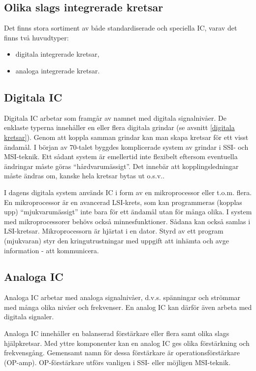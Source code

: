\subsection{Olika slags integrerade kretsar}

Det finns stora sortiment av både standardiserade och speciella IC, varav det
finns två huvudtyper:
\begin{itemize}
\item digitala integrerade kretsar,
\item analoga integrerade kretsar.
\end{itemize}

\subsection{Digitala IC}

Digitala IC arbetar som framgår av namnet med digitala signalnivåer. De enklaste
typerna innehåller en eller flera digitala grindar (se avsnitt \ref{digitala kretsar}). Genom att
koppla samman grindar kan man skapa kretsar för ett visst ändamål. I början av
70-talet byggdes komplicerade system av grindar i SSI- och MSI-teknik. Ett
sådant system är emellertid inte flexibelt eftersom eventuella ändringar måste
göras ``hårdvarumässigt''. Det innebär att kopplingsledningar måste ändras om,
kanske hela kretsar bytas ut o.s.v..

I dagens digitala system används IC i form av en mikroprocessor eller t.o.m.
flera. En mikroprocessor är en avancerad LSI-krets, som kan programmeras
(kopplas upp) ``mjukvarumässigt'' inte bara för ett ändamål utan för många
olika. I system med mikroprocessorer behövs också minnesfunktioner. Sådana kan
också samlas i LSI-kretsar. Mikroprocessorn är hjärtat i en dator. Styrd av ett
program (mjukvaran) styr den kringutrustningar med uppgift att inhämta och avge
information - att kommunicera.

\subsection{Analoga IC}

Analoga IC arbetar med analoga signalnivåer, d.v.s. spänningar och strömmar med
många olika nivåer och frekvenser. En analog IC kan därför även arbeta med
digitala signaler.

Analoga IC innehåller en balanserad förstärkare eller flera samt olika slags
hjälpkretsar. Med yttre komponenter kan en analog IC ges olika förstärkning och
frekvensgång. Gemensamt namn för dessa förstärkare är operationsförstärkare
(OP-amp). OP-förstärkare utförs vanligen i SSI- eller möjligen MSI-teknik.

